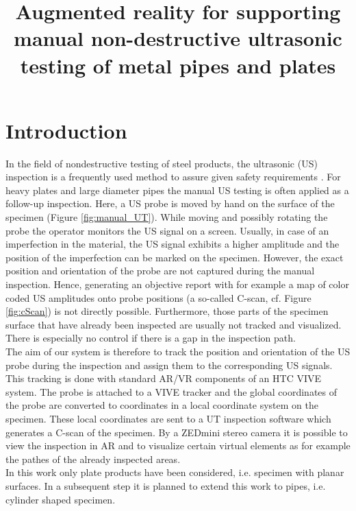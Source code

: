 \documentclass{VRARWorkshop}
\title{Augmented reality for supporting manual non-destructive ultrasonic testing of metal pipes and plates}
\begin{document}
\section{Introduction}

In the field of nondestructive testing of steel products, the ultrasonic (US) inspection is a frequently used method to assure given safety requirements \cite{deutsch_zfp_2010} \cite{moles_introduction_2004}
\cite{olympus_Grundlagen}.
For heavy plates and large diameter pipes the manual US testing is often applied as a follow-up inspection. Here, a US probe is moved by hand on the surface of the specimen (Figure \ref{fig:manual_UT}). While moving and possibly rotating the probe the operator monitors the US signal on a screen. Usually, in case of an imperfection in the material, the US signal exhibits a higher amplitude and the position of the imperfection can be marked on the specimen.
However, the exact position and orientation of the probe are not captured during the manual inspection. Hence, generating an objective report with for example a map of color coded US amplitudes onto probe positions (a so-called C-scan, cf. Figure \ref{fig:cScan}) is not directly possible.
Furthermore, those parts of the specimen surface that have already been inspected are usually not tracked and visualized.
There is especially no control if there is a gap in the inspection path. \\
The aim of our system is therefore to track the position and orientation of the US probe during the inspection and assign them to the corresponding US signals. This tracking is done with standard AR/VR components of an HTC VIVE system. The probe is attached to a VIVE tracker and the global coordinates of the probe are converted to coordinates in a local coordinate system on the specimen. These local coordinates are sent to a UT inspection software which generates a C-scan of the specimen.
By a ZEDmini stereo camera it is possible to view the inspection in AR and to visualize certain virtual elements as for example the pathes of the already inspected areas. \\
In this work only plate products have been considered, i.e. specimen with planar surfaces. In a subsequent step it is planned to extend this work to pipes, i.e. cylinder shaped specimen.
\end{document}
